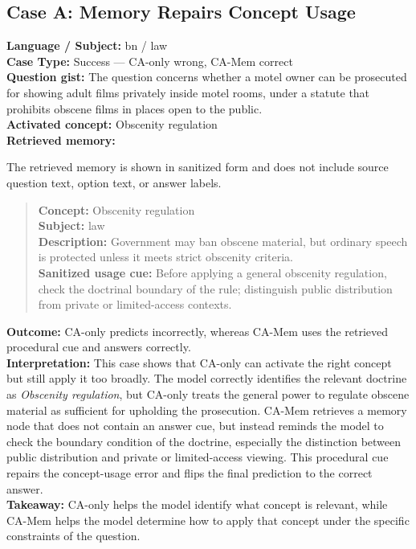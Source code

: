\documentclass[11pt]{article}
\begin{document}
\subsection{Case A: Memory Repairs Concept Usage}
\noindent\textbf{Language / Subject:} bn / law\\
\textbf{Case Type:} Success --- CA-only wrong, CA-Mem correct\\
\textbf{Question gist:} The question concerns whether a motel owner can be prosecuted for showing adult films privately inside motel rooms, under a statute that prohibits obscene films in places open to the public.\\
\textbf{Activated concept:} Obscenity regulation\\
\textbf{Retrieved memory:}

The retrieved memory is shown in sanitized form and does not include source question text, option text, or answer labels.

\begin{quote}\small
\textbf{Concept:} Obscenity regulation \\
\textbf{Subject:} law \\
\textbf{Description:} Government may ban obscene material, but ordinary speech is protected unless it meets strict obscenity criteria. \\
\textbf{Sanitized usage cue:} Before applying a general obscenity regulation, check the doctrinal boundary of the rule; distinguish public distribution from private or limited-access contexts.
\end{quote}

\noindent\textbf{Outcome:} CA-only predicts incorrectly, whereas CA-Mem uses the retrieved procedural cue and answers correctly.\\
\textbf{Interpretation:} This case shows that CA-only can activate the right concept but still apply it too broadly. The model correctly identifies the relevant doctrine as \textit{Obscenity regulation}, but CA-only treats the general power to regulate obscene material as sufficient for upholding the prosecution. CA-Mem retrieves a memory node that does not contain an answer cue, but instead reminds the model to check the boundary condition of the doctrine, especially the distinction between public distribution and private or limited-access viewing. This procedural cue repairs the concept-usage error and flips the final prediction to the correct answer.\\
\textbf{Takeaway:} CA-only helps the model identify what concept is relevant, while CA-Mem helps the model determine how to apply that concept under the specific constraints of the question.
\end{document}
